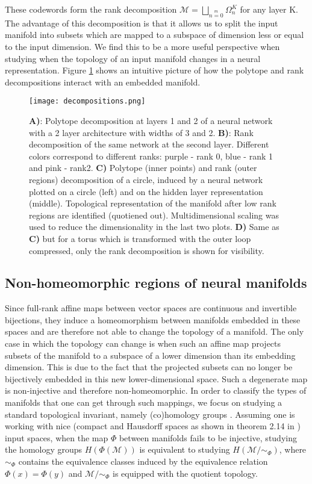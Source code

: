 These codewords form the rank decomposition $\mathcal{M} = \bigsqcup\limits_{n=0}\limits^{m}\Omega_n^K$ for any layer K. The advantage of this decomposition is that it allows us to split the input manifold into subsets which are mapped to a subspace of dimension less or equal to the input dimension. We find this to be a more useful perspective when studying when the topology of an input manifold changes in a neural representation. Figure \ref{fig:polytope decomp} shows an intuitive picture of how the polytope and rank decompositions interact with an embedded manifold.

\begin{figure}
    \centering
    \texttt{[image: decompositions.png]}
    \caption{\textbf{A)}: Polytope decomposition at layers 1 and 2 of a neural network with a 2 layer architecture with widths of 3 and 2. \textbf{B)}: Rank decomposition of the same network at the second layer. Different colors correspond to different ranks: purple - rank 0, blue - rank 1 and pink - rank2. \textbf{C)} Polytope (inner points) and rank (outer regions) decomposition of a circle, induced by a neural network plotted on a circle (left) and on the hidden layer representation (middle). Topological representation of the manifold after low rank regions are identified (quotiened out). Multidimensional scaling was used to reduce the dimensionality in the last two plots. \textbf{D)} Same as \textbf{C)} but for a torus which is transformed with the outer loop compressed, only the rank decomposition is shown for visibility.}
    \label{fig:polytope decomp}
\end{figure}

\subsection{Non-homeomorphic regions of neural manifolds}
Since full-rank affine maps between vector spaces are continuous and invertible bijections, they induce a homeomorphism between manifolds embedded in these spaces and are therefore not able to change the topology of a manifold. The only case in which the topology can change is when such an affine map projects subsets of the manifold to a subspace of a lower dimension than its embedding dimension. This is due to the fact that the projected subsets can no longer be bijectively embedded in this new lower-dimensional space. Such a degenerate map is non-injective and therefore non-homeomorphic. In order to classify the types of manifolds that one can get through such mappings, we focus on studying a standard topological invariant, namely (co)homology groups \cite{hatcher2005algebraic}. Assuming one is working with nice (compact and Hausdorff spaces as shown in theorem 2.14 in \cite{vick2012homology}) input spaces, when the map $\Phi$ between manifolds fails to be injective, studying the homology groups $H(\Phi(\mathcal{M}))$ is equivalent to studying $H(\mathcal{M} / \sim_\Phi)$, where $\sim_\Phi$ contains the equivalence classes induced by the equivalence relation $\Phi(x)=\Phi(y)$ and $\mathcal{M} / \sim_\Phi$ is equipped with the quotient topology.

